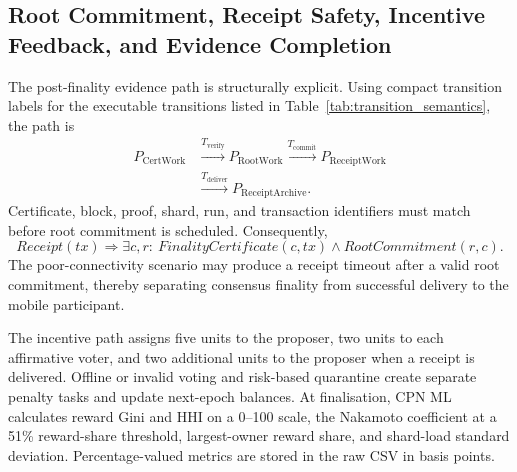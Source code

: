 \documentclass[a4paper,fleqn]{cas-sc}
\begin{document}
\subsection{Root Commitment, Receipt Safety, Incentive Feedback, and Evidence Completion}
\label{subsec:finality_commitment}
\label{subsec:rewards_evidence}

The post-finality evidence path is structurally explicit. Using compact
transition labels for the executable transitions listed in
Table~\ref{tab:transition_semantics}, the path is
\begin{align}
P_{\mathrm{CertWork}}
&\xrightarrow{T_{\mathrm{verify}}}P_{\mathrm{RootWork}}
\xrightarrow{T_{\mathrm{commit}}}P_{\mathrm{ReceiptWork}}\nonumber\\
&\xrightarrow{T_{\mathrm{deliver}}}P_{\mathrm{ReceiptArchive}}.
\label{eq:receipt_path}
\end{align}
Certificate, block, proof, shard, run, and transaction identifiers must match
before root commitment is scheduled. Consequently,
\begin{equation}
Receipt(tx)\Rightarrow
\exists c,r:\ FinalityCertificate(c,tx)\wedge RootCommitment(r,c).
\label{eq:receipt_after_root}
\end{equation}
The poor-connectivity scenario may produce a receipt timeout after a valid root
commitment, thereby separating consensus finality from successful delivery to
the mobile participant.

The incentive path assigns five units to the proposer, two units to each
affirmative voter, and two additional units to the proposer when a receipt is
delivered. Offline or invalid voting and risk-based quarantine create separate
penalty tasks and update next-epoch balances. At finalisation, CPN ML calculates
reward Gini and HHI on a 0--100 scale, the Nakamoto coefficient at a 51\%
reward-share threshold, largest-owner reward share, and shard-load standard
deviation. Percentage-valued metrics are stored in the raw CSV in basis points.
\end{document}
